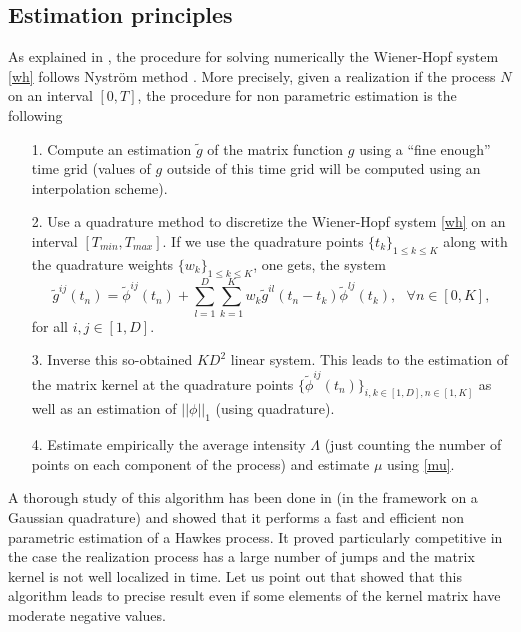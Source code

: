 \documentclass[a4paper,11pt]{article}
\begin{document}
\subsection{Estimation principles}
\label{principles}
As explained in \cite{bacry2014second}, the procedure for solving numerically the Wiener-Hopf system \eqref{wh} follows Nystr{\"o}m method \cite{nystrom1930praktische}. More precisely, given
a realization  if the process $N$ on an interval $[0,T]$, the procedure for
non parametric estimation is the following
\begin{itemize}
\item[1.] Compute an estimation $\tilde g$ of the matrix function $g$ using a ``fine enough'' time grid (values of $g$ outside of this time grid will be computed using an interpolation scheme).

\item[2.] Use a quadrature method to discretize the Wiener-Hopf system \eqref{wh}
on an interval $[T_{min},T_{max}]$. If we use the quadrature points $\{t_k\}_{1\le k \le K}$ along with the quadrature weights $\{w_k\}_{1\le k \le K}$, one gets, the system
\begin{equation}
\label{nscheme}
\tilde g^{ij}(t_n) =  \tilde \phi^{ij}(t_n) + \sum_{l=1}^{D}\sum_{k=1}^{K} w_k \tilde g^{il}(t_n-t_k) \tilde  \phi^{lj}(t_k),~~~\forall n \in [0,K],
\end{equation}
for all $i,j \in [1,D]$.
\item[3.] Inverse this so-obtained $KD^2$ linear system. This leads to the estimation of the matrix kernel at the quadrature points
$\{\tilde \phi^{ij}(t_n)\}_{i,k\in[1,D],n \in [1,K]}$ as well as an estimation of $||\phi||_1$ (using quadrature).
\item[4.] Estimate empirically the average intensity $\Lambda$ (just counting the number of points on each component of the process) and estimate $\mu$ using \eqref{mu}.
\end{itemize}
A thorough study of this algorithm has been done in \cite{bacry2014second} (in the framework on a Gaussian quadrature) and  showed that it performs a fast and efficient non parametric estimation of a Hawkes process. It proved particularly competitive in the case the realization process has a large number of jumps and the matrix kernel is not well localized in time. Let us point out that \cite{bacry2014second} showed that this algorithm leads to precise result even if some elements of the kernel matrix have moderate negative values.\\
\end{document}
